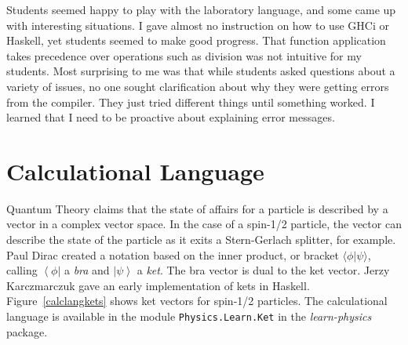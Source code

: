 \documentclass{eptcs}
\newcommand{\ket}[1]{\left| #1 \right\rangle}
\newcommand{\bra}[1]{\left\langle #1 \right|}
\begin{document}
Students seemed happy to play with the laboratory language,
and some came up with interesting situations.
I gave almost no instruction on how to use GHCi or Haskell,
yet students seemed to make good progress.
That function application takes precedence over
operations such as division was not intuitive for my students.
Most surprising to me was that while students asked questions
about a variety of issues, no one sought clarification about
why they were getting errors from the compiler.
They just tried different things until something worked.
I learned that I need to be proactive about explaining
error messages.

\section{Calculational Language}
\label{calclang}

Quantum Theory claims that the state of affairs for
a particle is described by a vector in a complex vector space.
In the case of a spin-1/2
particle, the vector can describe the state of the particle as it exits
a Stern-Gerlach splitter, for example.  Paul Dirac created a notation
based on the inner product, or bracket $\langle \phi | \psi \rangle$,
calling $\bra{\phi}$ a \emph{bra} and $\ket{\psi}$ a \emph{ket}.  The bra vector
is dual to the ket vector.  Jerzy Karczmarczuk gave an early
implementation of kets in Haskell.\cite{karczmarczuk2003}
Figure~\ref{calclangkets} shows ket
vectors for spin-1/2 particles.
The calculational language
is available in the module \texttt{Physics.Learn.Ket} in the \emph{learn-physics}
package\cite{learn-physics}.
\end{document}

